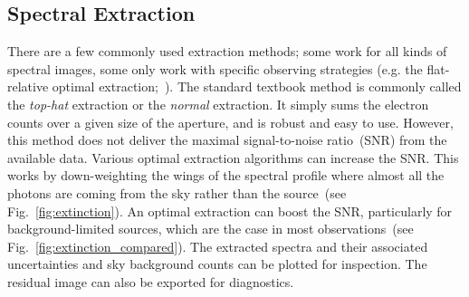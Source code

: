 \documentclass[fleqn,usenatbib]{mnras}
\begin{document}
\subsection{Spectral Extraction}
\label{sec:extract}
There are a few commonly used extraction methods; some work for
all kinds of spectral images, some only work with specific
observing strategies (e.g. the flat-relative optimal
extraction;~\citealt{2014A&A...561A..59Z}). The standard textbook
method is commonly called the \textit{top-hat} extraction or the
\textit{normal} extraction. It simply sums the electron counts over
a given size of the aperture, and is robust and easy to use. However,
this method does not deliver the maximal signal-to-noise ratio~(SNR)
from the available data. Various optimal extraction algorithms
can increase the SNR. This works by down-weighting the wings of the
spectral profile where almost all the photons are coming from the sky
rather than the source~(see Fig.~\ref{fig:extinction}). An optimal
extraction can boost the SNR, particularly for background-limited
sources, which are the case in most observations~(see
Fig.~\ref{fig:extinction_compared}). The extracted spectra and their
associated uncertainties and sky background counts can be plotted
for inspection. The residual image can also be exported for diagnostics.
\end{document}
